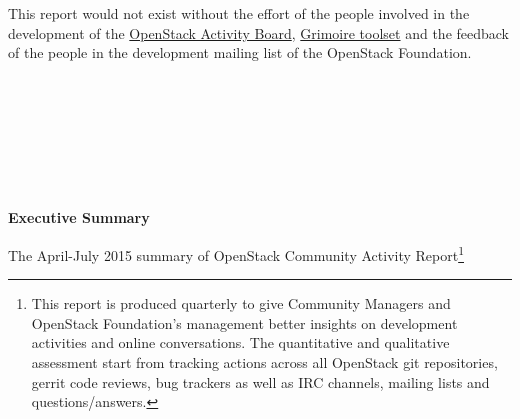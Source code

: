 \documentclass[a4wide,11pt]{report}
\begin{document}
This report would not exist without the effort of the people involved in the development of the \href{https://activity.openstack.org/dash}{OpenStack Activity Board}, \href{http://metricsgrimoire.github.io}{Grimoire toolset} and the feedback of the people in the development mailing list of the OpenStack Foundation.

~~\\
~~\\
~~\\
~~\\
~~\\
~~\\







\newpage

\begin{center}
\textbf{Executive Summary}
\end{center}

The April-July 2015 summary of OpenStack Community Activity
Report\footnote{This report is produced quarterly to give Community
Managers and OpenStack Foundation's management better insights on
development activities and online conversations. The quantitative and
qualitative assessment start from tracking actions across all
OpenStack git repositories, gerrit code reviews, bug trackers as well
as IRC channels, mailing lists and questions/answers.} 
\end{document}
